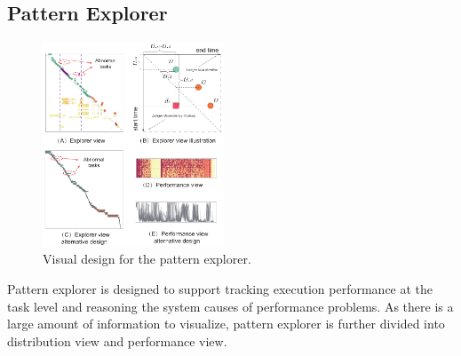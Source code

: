 \subsection{Pattern Explorer}


\begin{figure}[t]
	\centering
	\includegraphics[width=0.48\textwidth]{figures/visualization/patternexplorer.pdf}
	\vspace{-3mm}
	\caption{Visual design for the pattern explorer.}
	\label{fig:explorer}
	\vspace{-3mm}
\end{figure}


Pattern explorer is designed to support tracking execution performance at the task level and reasoning the system causes of performance problems. As there is a large amount of information to visualize, pattern explorer is further divided into distribution view and performance view.

